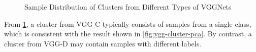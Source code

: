 \documentclass[sigplan,10pt,review]{acmart}\settopmatter{printfolios=true,printccs=false,printacmref=false}
\begin{document}
\begin{figure}[h]
    \centering
    \begin{minipage}{0.99\linewidth}
    \end{minipage}

    \begin{minipage}{0.99\linewidth}
    \end{minipage}
    \caption{Sample Distribution of Clusters from Different Types of VGGNets}
    \label{fig:vgg-cluster}

\end{figure}

From \cref{fig:vgg-cluster}, a cluster from VGG-C typically consists of samples from a single class, which is consistent with the result shown in \cref{fig:vgg-cluster-pca}. 
By contrast, a cluster from VGG-D may contain samples with different labels.
\end{document}
